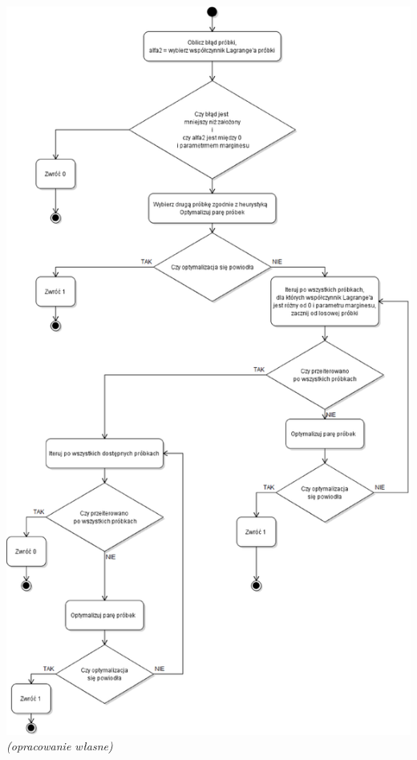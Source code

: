 \documentclass[[10pt,a4paper]{article}
\begin{document}
\begin{center}
\includegraphics[scale=0.45]{examineExample}\\
\textit{(opracowanie własne)}
\end{center}
\end{document}
